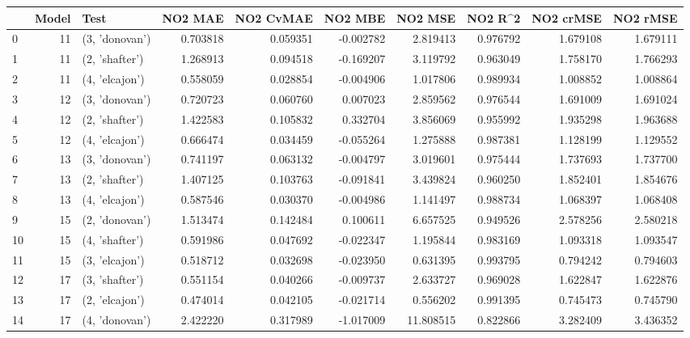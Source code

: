 \begin{tabular}{lrlrrrrrrr}
\toprule
{} &  Model &            Test &   NO2 MAE &  NO2 CvMAE &   NO2 MBE &    NO2 MSE &   NO2 R\textasciicircum2 &  NO2 crMSE &  NO2 rMSE \\
\midrule
0  &     11 &  (3, 'donovan') &  0.703818 &   0.059351 & -0.002782 &   2.819413 &  0.976792 &   1.679108 &  1.679111 \\
1  &     11 &  (2, 'shafter') &  1.268913 &   0.094518 & -0.169207 &   3.119792 &  0.963049 &   1.758170 &  1.766293 \\
2  &     11 &  (4, 'elcajon') &  0.558059 &   0.028854 & -0.004906 &   1.017806 &  0.989934 &   1.008852 &  1.008864 \\
3  &     12 &  (3, 'donovan') &  0.720723 &   0.060760 &  0.007023 &   2.859562 &  0.976544 &   1.691009 &  1.691024 \\
4  &     12 &  (2, 'shafter') &  1.422583 &   0.105832 &  0.332704 &   3.856069 &  0.955992 &   1.935298 &  1.963688 \\
5  &     12 &  (4, 'elcajon') &  0.666474 &   0.034459 & -0.055264 &   1.275888 &  0.987381 &   1.128199 &  1.129552 \\
6  &     13 &  (3, 'donovan') &  0.741197 &   0.063132 & -0.004797 &   3.019601 &  0.975444 &   1.737693 &  1.737700 \\
7  &     13 &  (2, 'shafter') &  1.407125 &   0.103763 & -0.091841 &   3.439824 &  0.960250 &   1.852401 &  1.854676 \\
8  &     13 &  (4, 'elcajon') &  0.587546 &   0.030370 & -0.004986 &   1.141497 &  0.988734 &   1.068397 &  1.068408 \\
9  &     15 &  (2, 'donovan') &  1.513474 &   0.142484 &  0.100611 &   6.657525 &  0.949526 &   2.578256 &  2.580218 \\
10 &     15 &  (4, 'shafter') &  0.591986 &   0.047692 & -0.022347 &   1.195844 &  0.983169 &   1.093318 &  1.093547 \\
11 &     15 &  (3, 'elcajon') &  0.518712 &   0.032698 & -0.023950 &   0.631395 &  0.993795 &   0.794242 &  0.794603 \\
12 &     17 &  (3, 'shafter') &  0.551154 &   0.040266 & -0.009737 &   2.633727 &  0.969028 &   1.622847 &  1.622876 \\
13 &     17 &  (2, 'elcajon') &  0.474014 &   0.042105 & -0.021714 &   0.556202 &  0.991395 &   0.745473 &  0.745790 \\
14 &     17 &  (4, 'donovan') &  2.422220 &   0.317989 & -1.017009 &  11.808515 &  0.822866 &   3.282409 &  3.436352 \\

\end{tabular}
